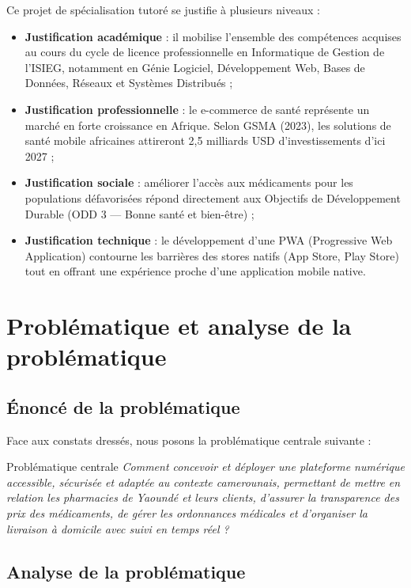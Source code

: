 \documentclass[12pt,a4paper,oneside]{report}
\begin{document}
Ce projet de spécialisation tutoré se justifie à plusieurs niveaux :

\begin{itemize}
  \item \textbf{Justification académique} : il mobilise l'ensemble des compétences acquises au cours du cycle de licence professionnelle en Informatique de Gestion de l'ISIEG, notamment en Génie Logiciel, Développement Web, Bases de Données, Réseaux et Systèmes Distribués ;
  \item \textbf{Justification professionnelle} : le e-commerce de santé représente un marché en forte croissance en Afrique. Selon GSMA (2023), les solutions de santé mobile africaines attireront 2,5 milliards USD d'investissements d'ici 2027 ;
  \item \textbf{Justification sociale} : améliorer l'accès aux médicaments pour les populations défavorisées répond directement aux Objectifs de Développement Durable (ODD 3 — Bonne santé et bien-être) ;
  \item \textbf{Justification technique} : le développement d'une PWA (Progressive Web Application) contourne les barrières des stores natifs (App Store, Play Store) tout en offrant une expérience proche d'une application mobile native.
\end{itemize}

\section{Problématique et analyse de la problématique}

\subsection{Énoncé de la problématique}

Face aux constats dressés, nous posons la problématique centrale suivante :

\begin{defbox}{Problématique centrale}
\textit{Comment concevoir et déployer une plateforme numérique accessible, sécurisée et adaptée au contexte camerounais, permettant de mettre en relation les pharmacies de Yaoundé et leurs clients, d'assurer la transparence des prix des médicaments, de gérer les ordonnances médicales et d'organiser la livraison à domicile avec suivi en temps réel ?}
\end{defbox}

\subsection{Analyse de la problématique}
\end{document}
